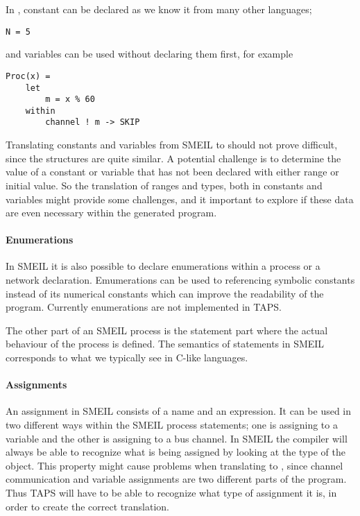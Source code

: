 In \cspm, constant can be declared as we know it from many other languages;
\begin{verbatim}
N = 5
\end{verbatim}
and variables can be used without declaring them first, for example
\begin{verbatim}
Proc(x) =
    let
        m = x % 60
    within
        channel ! m -> SKIP
\end{verbatim}

Translating constants and variables from SMEIL to \cspm should not prove difficult, since the structures are quite similar.
A potential challenge is to determine the value of a constant or variable that has not been declared with either range or initial value. So the translation of ranges and types, both in constants and variables might provide some challenges, and it important to explore if these data are even necessary within the generated \cspm program.
\paragraph{Enumerations}
In SMEIL it is also possible to declare enumerations within a process or a network declaration. Emumerations can be used to referencing symbolic constants instead of its numerical constants which can improve the readability of the program.
Currently enumerations are not implemented in TAPS.




The other part of an SMEIL process is the statement part where the actual behaviour of the process is defined. The semantics of statements in SMEIL corresponds to what we typically see in C-like languages.

\paragraph{Assignments}
An assignment in SMEIL consists of a name and an expression. It can be used in two different ways within the SMEIL process statements; one is assigning to a variable and the other is assigning to a bus channel. In SMEIL the compiler will always be able to recognize what is being assigned by looking at the type of the object.
This property might cause problems when translating to \cspm, since channel communication and variable assignments are two different parts of the \cspm program. Thus TAPS will have to be able to recognize what type of assignment it is, in order to create the correct translation.
